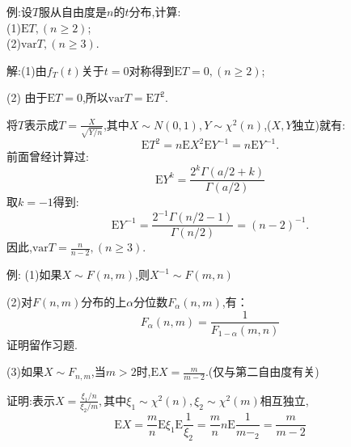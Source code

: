 	\begin{frame}
		例:设$T$服从自由度是$n$的$t$分布,计算: \\
		(1)$\mathrm{E}T,(n\geqslant 2)$;\\
		(2)$\mathrm{var}T,(n\geqslant 3)$.
		
		解:(1)由$f_T(t)$关于$t=0$对称得到\alert{$\mathrm{E}T = 0,(n\geqslant 2)$};
		
		(2) 由于$\mathrm{E}T = 0$,所以$\mathrm{var}T = \mathrm{E}T^2$.
		
		将$T$表示成$T=\frac{X}{\sqrt{Y/n}}$,其中$X\sim N(0,1),Y\sim\chi^2(n)$,($X,Y$独立)就有:
		\begin{equation}
			\mathrm{E}T^2 = n\mathrm{E}X^2\mathrm{E}Y^{-1} = n\mathrm{E}Y^{-1}.
		\end{equation}
		前面曾经计算过:
		\begin{equation}
			\mathrm{E}Y^k = \frac{2^k\Gamma(a/2+k)}{\Gamma(a/2)}
		\end{equation}
		取$k=-1$得到:
		\begin{equation}
			\mathrm{E}Y^{-1} = \frac{2^{-1}\Gamma(n/2-1)}{\Gamma(n/2)} = (n-2)^{-1}.
		\end{equation}
		因此,\alert{$\mathrm{var}T = \frac{n}{n-2},(n\geqslant 3)$.}
	\end{frame}

	\begin{frame}
		例: (1)如果$X\sim F(n,m)$,则$X^{-1}\sim F(m,n)$
		
		(2)对$F(n,m)$分布的上$\alpha$分位数$F_{\alpha}(n,m)$,有：
		\alert{
		\begin{equation}
			F_{\alpha}(n,m) = \frac{1}{F_{1-\alpha}(m,n)}
		\end{equation}	
		}
		证明留作习题.
		
		(3)如果$X\sim F_{n,m}$,当$m>2$时,$\mathrm{E}X = \frac{m}{m-2}$.(仅与第二自由度有关)
		
		证明:表示$X = \frac{\xi_1/n}{\xi_2/m},$其中$\xi_1\sim\chi^2(n),\xi_2\sim\chi^2(m)$相互独立,
		\begin{equation}
			\mathrm{E}X = \frac{m}{n}\mathrm{E}\xi_1\mathrm{E}\frac{1}{\xi_2} = \frac{m}{n}n\mathrm{E}\frac{1}{m -_2} = \frac{m}{m-2}
		\end{equation}
	\end{frame}
